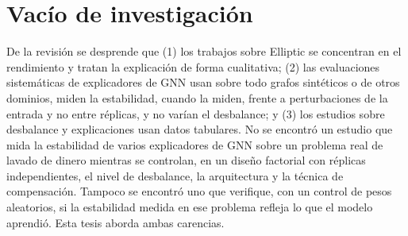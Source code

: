 \section{Vacío de investigación}\label{sec:ea_vacio}

De la revisión se desprende que (1) los trabajos sobre Elliptic se concentran en el
rendimiento y tratan la explicación de forma cualitativa; (2) las evaluaciones sistemáticas de
explicadores de GNN usan sobre todo grafos sintéticos o de otros dominios, miden la estabilidad,
cuando la miden, frente a perturbaciones de la entrada y no entre réplicas, y no varían el
desbalance; y (3) los estudios sobre desbalance y explicaciones usan datos tabulares. No se
encontró un estudio que mida la estabilidad de varios explicadores de GNN sobre un problema
real de lavado de dinero mientras se controlan, en un diseño factorial con réplicas
independientes, el nivel de desbalance, la arquitectura y la técnica de compensación. Tampoco
se encontró uno que verifique, con un control de pesos aleatorios, si la estabilidad medida en
ese problema refleja lo que el modelo aprendió. Esta tesis aborda ambas carencias.

